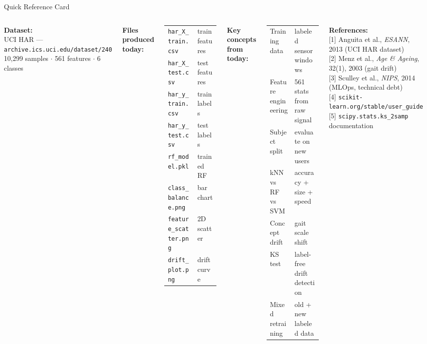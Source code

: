 \documentclass[aspectratio=169,11pt]{beamer}
\begin{document}
\begin{frame}[shrink=8]{Quick Reference Card}
    \footnotesize
    \begin{columns}
        \textbf{Dataset:}\\
        UCI HAR --- \texttt{archive.ics.uci.edu/dataset/240}\\
        10,299 samples $\cdot$ 561 features $\cdot$ 6 classes

        \vspace{0.15cm}
        \textbf{Files produced today:}
        \begin{tabular}{ll}
            \texttt{har\_X\_train.csv} & train features \\
            \texttt{har\_X\_test.csv}  & test features \\
            \texttt{har\_y\_train.csv} & train labels \\
            \texttt{har\_y\_test.csv}  & test labels \\
            \texttt{rf\_model.pkl}     & trained RF \\
            \texttt{class\_balance.png} & bar chart \\
            \texttt{feature\_scatter.png} & 2D scatter \\
            \texttt{drift\_plot.png}   & drift curve \\
        \end{tabular}

        \textbf{Key concepts from today:}
        \begin{tabular}{ll}
            Training data & labeled sensor windows \\
            Feature engineering & 561 stats from raw signal \\
            Subject split & evaluate on new users \\
            kNN vs RF vs SVM & accuracy + size + speed \\
            Concept drift & gait scale shift \\
            KS test & label-free drift detection \\
            Mixed retraining & old + new labeled data \\
        \end{tabular}

        \vspace{0.2cm}
        \textbf{References:}\\
        {[1]} Anguita et al., \textit{ESANN}, 2013 (UCI HAR dataset)\\
        {[2]} Menz et al., \textit{Age \& Ageing}, 32(1), 2003 (gait drift)\\
        {[3]} Sculley et al., \textit{NIPS}, 2014 (MLOps, technical debt)\\
        {[4]} \texttt{scikit-learn.org/stable/user\_guide}\\
        {[5]} \texttt{scipy.stats.ks\_2samp} documentation
    \end{columns}
    \normalsize
\end{frame}
\end{document}
